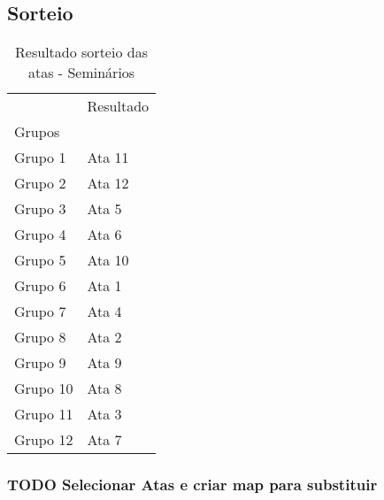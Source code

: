 \documentclass[11pt]{article}
\begin{document}
\subsection{Sorteio}
\label{sec:org9833b80}
\begin{table}
\centering
\caption{Resultado sorteio das atas - Seminários}
\begin{tabular}{ll}
\toprule
{} & Resultado \\
Grupos   &           \\
\midrule
Grupo 1  &    Ata 11 \\
Grupo 2  &    Ata 12 \\
Grupo 3  &     Ata 5 \\
Grupo 4  &     Ata 6 \\
Grupo 5  &    Ata 10 \\
Grupo 6  &     Ata 1 \\
Grupo 7  &     Ata 4 \\
Grupo 8  &     Ata 2 \\
Grupo 9  &     Ata 9 \\
Grupo 10 &     Ata 8 \\
Grupo 11 &     Ata 3 \\
Grupo 12 &     Ata 7 \\
\bottomrule
\end{tabular}
\end{table}


\subsubsection{{\bfseries\sffamily TODO} Selecionar Atas e criar map para substituir}
\label{sec:orgcccc87f}
\end{document}
